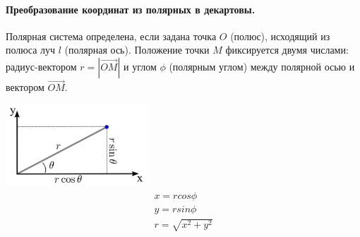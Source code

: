\documentclass[a4paper]{article}
\numberwithin{equation}{section}
\begin{document}
\paragraph{Преобразование координат из полярных в декартовы.}
Полярная система определена, если задана точка $O$ (полюс), исходящий из полюса луч $l$ (полярная ось).
Положение точки $M$ фиксируется двумя числами: радиус-вектором $r=|\vec{OM}|$ и углом $\phi$ (полярным углом) между полярной осью и вектором $\vec{OM}$.
\begin{multicols}{2}
    \includegraphics[width=0.4\textwidth]{Polar-Cartesian-Coordinates-Feature.jpg}
    \columnbreak
    \null \vfill 
    \begin{gather*}
        x = r cos\phi \\
        y = r sin\phi \\
        r = \sqrt{x^2 + y^2}
    \end{gather*}
    \vfill \null
\end{multicols}
\end{document}
